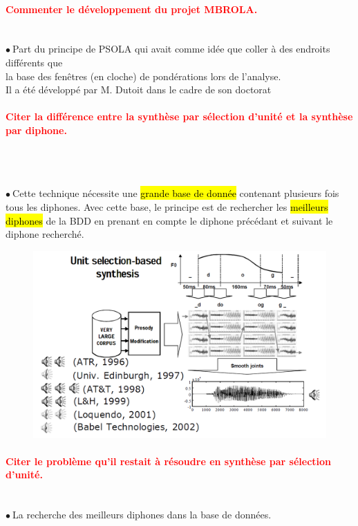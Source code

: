 \documentclass[letterpaper, 12pt]{article}
\newcommand{\alinea}{
\hspace*{0.3cm}}
\newcommand{\red}[1]{
	\textcolor{red}{#1}
}
\newcommand{\point}{$\bullet\ $}
\begin{document}
		\paragraph{\red{Commenter le développement du projet MBROLA.}}~\\
			\point Part du principe de PSOLA qui avait comme idée que coller à des endroits différents que  
				\\\alinea la base des fenêtres (en cloche) de pondérations lors de l'analyse.
				\\\alinea Il a été développé par M. Dutoit dans le cadre de son doctorat
		\paragraph{\red{Citer la différence entre la synthèse par sélection d'unité et la synthèse par diphone.}}
		~\\~\\
			\begin{minipage}{0.4\textwidth}
				\point Cette technique nécessite une \hl{grande base de donn\'ee} contenant plusieurs fois tous 
					les diphones. Avec cette base, le principe est de rechercher les \hl{meilleurs diphones}
					de la BDD en prenant en compte le diphone précédant et suivant le diphone recherché.
			\end{minipage}\hfill
			\begin{minipage}{0.55\textwidth}
				\begin{figure}[H]
					\centering
					\includegraphics[scale=0.425]{Images/automatic_diphone}
				\end{figure}\noindent
			\end{minipage}
		\vspace*{-0.65cm}
		\paragraph{\red{Citer le problème qu'il restait à résoudre en synthèse par sélection d'unité.}}~\\
    		\point La recherche des meilleurs diphones dans la base de données.
\end{document}
